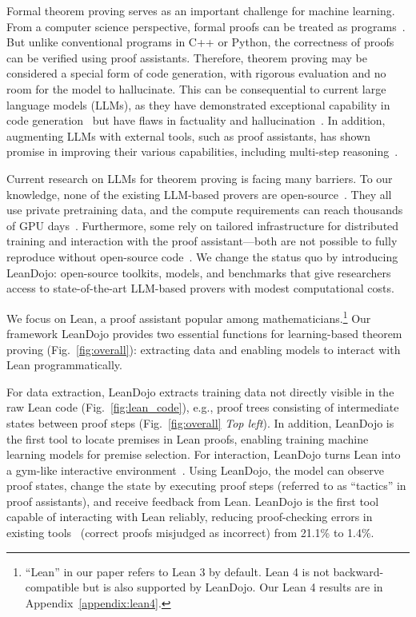 Formal theorem proving serves as an important challenge for machine learning. From a computer science perspective, formal proofs can be treated as programs~\cite{howard1980formulae}. But unlike conventional programs in C++ or Python, the correctness of proofs can be verified using proof assistants. Therefore, theorem proving may be considered a special form of code generation, with rigorous evaluation and no room for the model to hallucinate. This can be consequential to current large language models (LLMs), as they have demonstrated exceptional capability in code generation~\cite{chen2021evaluating} but have flaws in factuality and hallucination~\cite{ji2023survey}. In addition, augmenting LLMs with external tools, such as proof assistants, has shown promise in improving their various capabilities, including multi-step reasoning~\cite{schick2023toolformer}.

Current research on LLMs for theorem proving is facing many barriers. To our knowledge, none of the existing LLM-based provers are open-source~\cite{polu2020generative,jiang2021lisa,han2022proof,lample2022hypertree,jiang2022thor,polu2023formal,first2023baldur,wang2023dt}. They all use private pretraining data, and the compute requirements can reach thousands of GPU days~\cite{lample2022hypertree}. Furthermore, some rely on tailored infrastructure for distributed training and interaction with the proof assistant---both are not possible to fully reproduce without open-source code~\cite{polu2023formal,lample2022hypertree}. We change the status quo by introducing LeanDojo: open-source toolkits, models, and benchmarks that give researchers access to state-of-the-art LLM-based provers with modest computational costs.


We focus on Lean, a proof assistant popular among mathematicians.\footnote{``Lean'' in our paper refers to Lean 3 by default. Lean 4 is not backward-compatible but is also supported by LeanDojo. Our Lean 4 results are in Appendix~\ref{appendix:lean4}.} Our framework LeanDojo provides two essential functions for learning-based theorem proving (Fig.~\ref{fig:overall}): extracting data and enabling models to interact with Lean programmatically. 


For data extraction, LeanDojo extracts training data not directly visible in the raw Lean code (Fig.~\ref{fig:lean_code}), e.g., proof trees consisting of intermediate states between proof steps (Fig.~\ref{fig:overall} \emph{Top left}). In addition, LeanDojo is the first tool to locate premises in Lean proofs, enabling training machine learning models for premise selection. For interaction, LeanDojo turns Lean into a gym-like interactive environment~\cite{brockman2016openai}. Using LeanDojo, the model can observe proof states, change the state by executing proof steps (referred to as ``tactics'' in proof assistants), and receive feedback from Lean. LeanDojo is the first tool capable of interacting with Lean reliably, reducing proof-checking errors in existing tools~\cite{polu2023formal} (correct proofs misjudged as incorrect) from 21.1\% to 1.4\%. 



